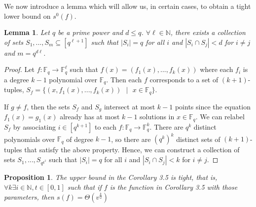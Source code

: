 \documentclass[psamsfonts]{amsart}
\newtheorem{prop}[theorem]{Proposition}
\newtheorem{lem}[theorem]{Lemma}
\theoremstyle{definition}
\theoremstyle{remark}
\numberwithin{equation}{section}
\begin{document}
	We now introduce a lemma which will allow us, in certain cases, to obtain a tight lower bound on $s^0(f)$.

	\begin{lem}
		Let $q$ be a prime power and $d \leq q$. $\forall\ell\in\mathbb{N}$, there exists a collection of sets $S_1, ..., S_m \subseteq [q^{\ell+1}]$ such that $|S_i| = q$ for all $i$ and $|S_i \cap S_j| < d$ for $i \neq j$ and $m = q^{d\ell}$.
	\end{lem}
	\begin{proof}
		Let $f : \mathbb{F}_q \rightarrow \mathbb{F}^\ell_q$ such that $f(x) = (f_1(x), ... ,f_k(x))$ where each $f_i$ is a degree $k-1$ polynomial over $\mathbb{F}_q$. Then each $f$ corresponds to a set of $(k+1)$-tuples, $S_f = \{(x,f_1(x),...,f_k(x))\text{ }  |\text{ } x \in \mathbb{F}_q\}$. 

		If $g \neq f$, then the sets $S_f$ and $S_g$ intersect at most $k-1$ points since the equation $f_1(x) = g_1(x)$ already has at most $k-1$ solutions in $x \in \mathbb{F}_q$. We can relabel $S_f$ by associating $i \in [q^{k+1}]$ to each $f : \mathbb{F}_q \rightarrow \mathbb{F}^k_q$. There are $q^k$ distinct polynomials over $\mathbb{F}_q$ of degree $k-1$, so there are $(q^k)^k$ distinct sets of $(k+1)$-tuples that satisfy the above property. Hence, we can construct a collection of sets $S_1, ..., S_{q^{k^2}}$ such that $|S_i| = q$ for all $i$ and $|S_i \cap S_j| < k$ for $i \neq j$.
	\end{proof}
	\begin{prop}
		The upper bound in the Corollary 3.5 is tight, that is, $\forall k\exists i\in\mathbb{N},t\in[0,1]$ such that if $f$ is the function in Corollary 3.5 with those parameters, then $s(f)=\Theta(v^\frac{k}{2})$
	\end{prop}
\end{document}

